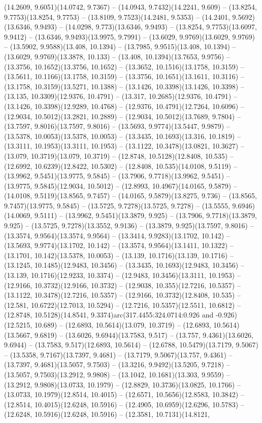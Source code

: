 (14.2609, 9.6051)(14.0742, 9.7367) -- (14.0943, 9.7432)(14.2241, 9.609) -- (13.8254, 9.7753)(13.8254, 9.7753) -- (13.8109, 9.7523)(14.2481, 9.5353) -- (14.2401, 9.5692)(13.6346, 9.9493) -- (14.0298, 9.773)(13.6346, 9.9493) -- (13.8254, 9.7753)(13.6097, 9.9412) -- (13.6346, 9.9493)(13.9975, 9.7991) -- (13.6029, 9.9769)(13.6029, 9.9769) -- (13.5902, 9.9588)(13.408, 10.1394) -- (13.7985, 9.9515)(13.408, 10.1394) -- (13.6029, 9.9769)(13.3878, 10.133) -- (13.408, 10.1394)(13.7653, 9.9756) -- (13.3756, 10.1652)(13.3756, 10.1652) -- (13.3652, 10.1516)(13.1758, 10.3159) -- (13.5611, 10.1166)(13.1758, 10.3159) -- (13.3756, 10.1651)(13.1611, 10.3116) -- (13.1758, 10.3159)(13.5271, 10.1388) -- (13.1426, 10.3398)(13.1426, 10.3398) -- (13.135, 10.3309)(12.9376, 10.4791) -- (13.317, 10.2685)(12.9376, 10.4791) -- (13.1426, 10.3398)(12.9289, 10.4768) -- (12.9376, 10.4791)(12.7264, 10.6096) -- (12.9034, 10.5012)(13.2821, 10.2889) -- (12.9034, 10.5012)(13.7689, 9.7804) -- (13.7597, 9.8016)(13.7597, 9.8016) -- (13.5693, 9.9774)(13.5447, 9.9879) -- (13.5378, 10.0053)(13.5378, 10.0053) -- (13.3435, 10.1693)(13.316, 10.1819) -- (13.3111, 10.1953)(13.3111, 10.1953) -- (13.1122, 10.3478)(13.0821, 10.3627) -- (13.079, 10.3719)(13.079, 10.3719) -- (12.8748, 10.5128)(12.8408, 10.535) -- (12.6992, 10.6239)(12.8422, 10.5302) -- (12.8408, 10.535)(14.0108, 9.5119) -- (13.9962, 9.5451)(13.9775, 9.5845) -- (13.7906, 9.7718)(13.9962, 9.5451) -- (13.9775, 9.5845)(12.9034, 10.5012) -- (12.8993, 10.4967)(14.0165, 9.5879) -- (14.0108, 9.5119)(13.8565, 9.7457) -- (14.0165, 9.5879)(13.8275, 9.736) -- (13.8565, 9.7457)(13.9775, 9.5845) -- (13.5725, 9.7278)(13.5725, 9.7278) -- (13.5555, 9.6946)(14.0069, 9.5111) -- (13.9962, 9.5451)(13.3879, 9.925) -- (13.7906, 9.7718)(13.3879, 9.925) -- (13.5725, 9.7278)(13.3552, 9.9136) -- (13.3879, 9.925)(13.7597, 9.8016) -- (13.3574, 9.9564)(13.3574, 9.9564) -- (13.3414, 9.9283)(13.1702, 10.142) -- (13.5693, 9.9774)(13.1702, 10.142) -- (13.3574, 9.9564)(13.1411, 10.1322) -- (13.1701, 10.142)(13.5378, 10.0053) -- (13.139, 10.1716)(13.139, 10.1716) -- (13.1245, 10.1485)(12.9483, 10.3456) -- (13.3435, 10.1693)(12.9483, 10.3456) -- (13.139, 10.1716)(12.9233, 10.3374) -- (12.9483, 10.3456)(13.3111, 10.1953) -- (12.9166, 10.3732)(12.9166, 10.3732) -- (12.9038, 10.355)(12.7216, 10.5357) -- (13.1122, 10.3478)(12.7216, 10.5357) -- (12.9166, 10.3732)(12.8408, 10.535) -- (12.581, 10.6722)(12.7013, 10.5294) -- (12.7216, 10.5357)(12.5511, 10.6812) -- (12.8748, 10.5128)(14.8541, 9.3374)arc(317.4455:324.0714:0.926 and -0.926)(12.5215, 10.689) -- (12.6893, 10.5614)(13.079, 10.3719) -- (12.6893, 10.5614)(13.5667, 9.6819) -- (13.6026, 9.6944)(13.7583, 9.517) -- (13.757, 9.4361)(13.6026, 9.6944) -- (13.7583, 9.517)(12.6893, 10.5614) -- (12.6788, 10.5479)(13.7179, 9.5067) -- (13.5358, 9.7167)(13.7397, 9.4681) -- (13.7179, 9.5067)(13.757, 9.4361) -- (13.7397, 9.4681)(13.5057, 9.7503) -- (13.3216, 9.9492)(13.5205, 9.7218) -- (13.5057, 9.7503)(13.2912, 9.9808) -- (13.1042, 10.1681)(13.303, 9.9559) -- (13.2912, 9.9808)(13.0733, 10.1979) -- (12.8829, 10.3736)(13.0825, 10.1766) -- (13.0733, 10.1979)(12.8514, 10.4015) -- (12.6571, 10.5656)(12.8583, 10.3842) -- (12.8514, 10.4015)(12.6248, 10.5916) -- (12.4905, 10.6959)(12.6296, 10.5783) -- (12.6248, 10.5916)(12.6248, 10.5916) -- (12.3581, 10.7131)(14.8121, 